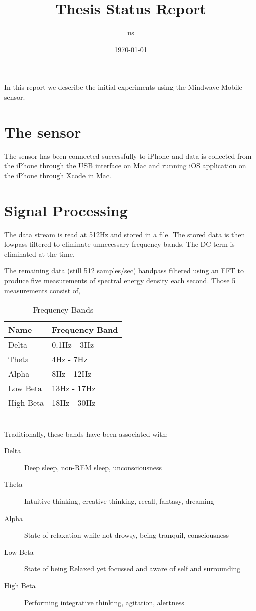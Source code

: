 \documentclass[11pt]{amsart}
\title{Thesis Status Report}
\author{us}
\date{\today}                                           %
\begin{document}
\maketitle
In this report we describe the initial experiments using the Mindwave Mobile sensor. 
\section{The sensor}
The sensor has been connected successfully to iPhone and data is collected from the iPhone through the USB interface on Mac and running iOS application on the iPhone through Xcode in Mac. 
\section{Signal Processing}
The data stream is read at 512Hz and stored in a file. The stored data is then lowpass filtered to eliminate unnecessary frequency bands. The DC term is eliminated at the time.

The remaining data (still 512 samples/sec) bandpass filtered using an FFT to produce five measurements of spectral energy density each second. Those 5 measurements consist of,
\begin{table}[h]
\centering
\caption{Frequency Bands}
\label{Bands}
\begin{tabular}{l l}
\hline
Name &Frequency Band\\\hline
Delta&0.1Hz - 3Hz\\
Theta&4Hz - 7Hz\\
Alpha&8Hz - 12Hz\\
Low Beta&13Hz - 17Hz\\
High Beta&18Hz - 30Hz\\
\end{tabular}
\end{table}\\
Traditionally, these bands have been associated with:
\begin{description}
\item[Delta] Deep sleep, non-REM sleep, unconsciousness
\item [Theta] Intuitive thinking, creative thinking, recall, fantasy, dreaming
\item [Alpha] State of relaxation while not drowsy, being tranquil, consciousness
\item [Low Beta] State of being Relaxed yet focussed and aware of self and surrounding
\item [High Beta] Performing integrative thinking, agitation, alertness
\end{description}
\end{document}
